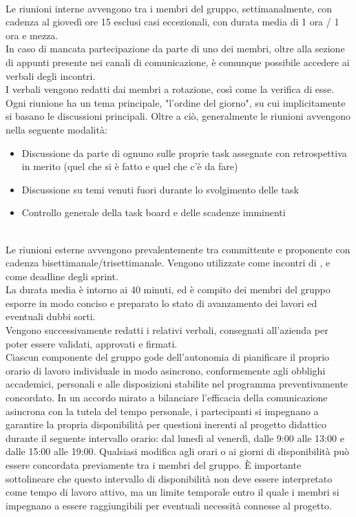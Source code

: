 \\
Le riunioni interne avvengono tra i membri del gruppo, settimanalmente, con cadenza al giovedì ore 15 esclusi casi eccezionali, con durata media di 1 ora / 1 ora e mezza.\\
In caso di mancata partecipazione da parte di uno dei membri, oltre alla sezione di appunti presente nei canali di comunicazione, è comunque possibile accedere ai verbali degli incontri.\\
I verbali vengono redatti dai membri a rotazione, così come la verifica di esse.\\
Ogni riunione ha un tema principale, "l'ordine del giorno", su cui implicitamente si basano le discussioni principali.
Oltre a ciò, generalmente le riunioni avvengono nella seguente modalità:
\begin{itemize}
  \item{Discussione da parte di ognuno sulle proprie task assegnate con retrospettiva in merito (quel che si è fatto e quel che c'è da fare)}
  \item{Discussione su temi venuti fuori durante lo svolgimento delle task}
  \item{Controllo generale della task board e delle scadenze imminenti}
\end{itemize}
\\
Le riunioni esterne avvengono prevalentemente tra committente e proponente con cadenza bisettimanale/trisettimanale. Vengono utilizzate come incontri di , e come deadline degli sprint.\\
La durata media è intorno ai 40 minuti, ed è compito dei membri del gruppo esporre in modo conciso e preparato lo stato di avanzamento dei lavori ed eventuali dubbi sorti.\\
Vengono successivamente redatti i relativi verbali, consegnati all'azienda per poter essere validati, approvati e firmati.
\\
Ciascun componente del gruppo gode dell'autonomia di pianificare il proprio orario di lavoro individuale in modo asincrono, conformemente agli obblighi accademici, personali e alle disposizioni stabilite nel programma preventivamente concordato.
In un accordo mirato a bilanciare l'efficacia della comunicazione asincrona con la tutela del tempo personale, i partecipanti si impegnano a garantire la propria disponibilità per questioni inerenti al progetto didattico durante il seguente intervallo orario: dal lunedì al venerdì, dalle 9:00 alle 13:00 e dalle 15:00 alle 19:00. Qualsiasi modifica agli orari o ai giorni di disponibilità può essere concordata previamente tra i membri del gruppo. È importante sottolineare che questo intervallo di disponibilità non deve essere interpretato come tempo di lavoro attivo, ma un limite temporale entro il quale i membri si impegnano a essere raggiungibili per eventuali necessità connesse al progetto.
